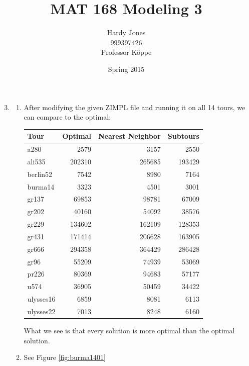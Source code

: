 \documentclass[12pt,letterpaper]{article}
\title{MAT 168 Modeling 3\vspace{-2ex}}
\author{Hardy Jones\\
        999397426\\
        Professor K\"{o}ppe\vspace{-2ex}}
\date{Spring 2015}
\begin{document}
  \maketitle

  \begin{enumerate}
    \setcounter{enumi}{2}
    \item
      \begin{enumerate}
        \item
          After modifying the given ZIMPL file and running it on all 14 tours,
          we can compare to the optimal:

          \begin{tabular}{l | r | r | r}
            \hline
            \hline
            Tour      & Optimal & Nearest Neighbor & Subtours \\
            \hline
            a280      & 2579    & 3157             & 2550     \\
            ali535    & 202310  & 265685           & 193429   \\
            berlin52  & 7542    & 8980             & 7164     \\
            burma14   & 3323    & 4501             & 3001     \\
            gr137     & 69853   & 98781            & 67009    \\
            gr202     & 40160   & 54092            & 38576    \\
            gr229     & 134602  & 162109           & 128353   \\
            gr431     & 171414  & 206628           & 163905   \\
            gr666     & 294358  & 364429           & 286428   \\
            gr96      & 55209   & 74939            & 53069    \\
            pr226     & 80369   & 94683            & 57177    \\
            u574      & 36905   & 50459            & 34422    \\
            ulysses16 & 6859    & 8081             & 6113     \\
            ulysses22 & 7013    & 8248             & 6160     \\
            \hline
          \end{tabular}

          What we see is that every solution is more optimal than the optimal solution.
        \item
          See Figure \ref{fig:burma1401}


\end{enumerate}
\end{enumerate}
\end{document}
